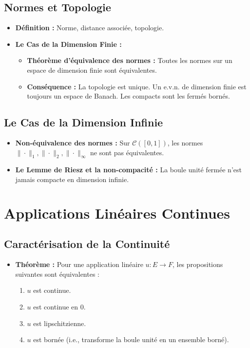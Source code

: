 \documentclass[12pt, a4paper, parskip=full]{report}
\theoremstyle{agregstyle}
\begin{document}
\subsection{Normes et Topologie}
\begin{itemize}
    \item \textbf{Définition :} Norme, distance associée, topologie.
    \item \textbf{Le Cas de la Dimension Finie :}
        \begin{itemize}
            \item \textbf{Théorème d'équivalence des normes :} Toutes les normes sur un espace de dimension finie sont équivalentes.
            \item \textbf{Conséquence :} La topologie est unique. Un e.v.n. de dimension finie est toujours un espace de Banach. Les compacts sont les fermés bornés.
        \end{itemize}
\end{itemize}
\subsection{Le Cas de la Dimension Infinie}
\begin{itemize}
    \item \textbf{Non-équivalence des normes :} Sur $\mathcal{C}([0,1])$, les normes $\|\cdot\|_1, \|\cdot\|_2, \|\cdot\|_\infty$ ne sont pas équivalentes.
    \item \textbf{Le Lemme de Riesz et la non-compacité :} La boule unité fermée n'est jamais compacte en dimension infinie.
\end{itemize}

\section{Applications Linéaires Continues}
\subsection{Caractérisation de la Continuité}
\begin{itemize}
    \item \textbf{Théorème :} Pour une application linéaire $u: E \to F$, les propositions suivantes sont équivalentes :
        \begin{enumerate}
            \item $u$ est continue.
            \item $u$ est continue en 0.
            \item $u$ est lipschitzienne.
            \item $u$ est bornée (i.e., transforme la boule unité en un ensemble borné).
        \end{enumerate}
\end{itemize}
\end{document}
